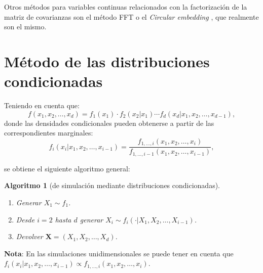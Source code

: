\documentclass[
  spanish,
  10pt,
]{book}
\renewcommand{\mathbf}[1]{\symbf{#1}}
\theoremstyle{break}
\newtheorem{conjecture}{Algoritmo}[chapter]
\theoremstyle{nonumberplain}
\begin{document}
Otros métodos para variables continuas relacionados con la factorización de la matriz de covarianzas son el método FFT \citep[transformada rápida de Fourier, e.g.][]{davies1987} o el \emph{Circular embedding} \citep{dietrich1997}, que realmente son el mismo.

\section{Método de las distribuciones condicionadas}\label{distrcond}

Teniendo en cuenta que:
\[f\left( x_1,x_2,\ldots,x_d\right) =f_1\left( x_1\right)  \cdot
f_2\left( x_2|x_1\right)  \cdots f_d\left( x_d|x_1,x_2,\ldots,x_{d-1}\right),\]
donde las densidades condicionales pueden obtenerse a partir de las
correspondientes marginales:
\[f_i\left( x_i|x_1,x_2,\ldots,x_{i-1}\right) = \frac{f_{1,\ldots
,i}\left( x_1,x_2,\ldots,x_i\right)  }{f_{1,\ldots,i-1}\left(
x_1,x_2,\ldots,x_{i-1}\right)},\]

se obtiene el siguiente algoritmo general:

\begin{conjecture}[de simulación mediante distribuciones condicionadas]
\protect\hypertarget{cnj:mult-distrcond}{}\label{cnj:mult-distrcond}\leavevmode

\begin{enumerate}
\def\labelenumi{\arabic{enumi}.}
\item
  Generar \(X_1 \sim f_1\).
\item
  Desde \(i=2\) hasta \(d\) generar
  \(X_i \sim f_i\left( \cdot|X_1,X_2,\ldots,X_{i-1}\right)\).
\item
  Devolver \(\mathbf{X} = \left( X_1,X_2,\ldots,X_d\right)\).
\end{enumerate}

\end{conjecture}

\textbf{Nota}: En las simulaciones unidimensionales se puede tener en cuenta que
\(f_i\left( x_i|x_1,x_2,\ldots,x_{i-1}\right)
\propto f_{1,\ldots,i}\left( x_1,x_2,\ldots,x_i\right)\).
\end{document}
